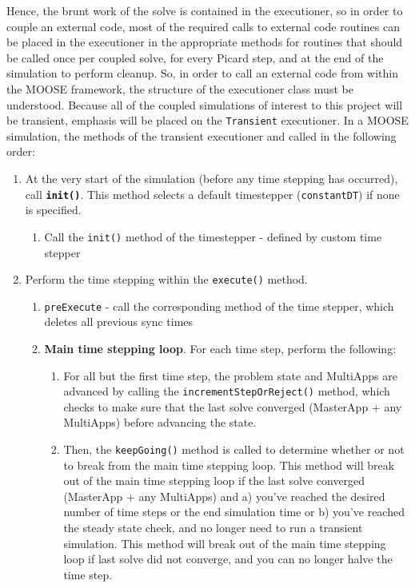 \documentclass[10pt]{article}
\numberwithin{equation}{section} %
\begin{document}
Hence, the brunt work of the solve is contained in the executioner, so in order to couple an external code, most of the required calls to external code routines can be placed in the executioner in the appropriate methods for routines that should be called once per coupled solve, for every Picard step, and at the end of the simulation to perform cleanup. So, in order to call an external code from within the MOOSE framework, the structure of the executioner class must be understood. Because all of the coupled simulations of interest to this project will be transient, emphasis will be placed on the {\tt Transient} executioner. In a MOOSE simulation, the methods of the transient executioner and called in the following order:

\begin{enumerate}
\item At the very start of the simulation (before any time stepping has occurred), call {\bf {\tt init()}}. This method selects a default timestepper ({\tt constantDT}) if none is specified.
	\begin{enumerate}
	\item Call the {\tt init()} method of the timestepper - defined by custom time stepper
	\end{enumerate}
\item Perform the time stepping within the {\tt execute()} method.
	\begin{enumerate}
	\item {\tt preExecute} - call the corresponding method of the time stepper, which deletes all previous sync times
	\item {\bf Main time stepping loop}. For each time step, perform the following:
		\begin{enumerate}
		\item For all but the first time step, the problem state and MultiApps are advanced by calling the {\tt incrementStepOrReject()} method, which checks to make sure that the last solve converged (MasterApp + any MultiApps) before advancing the state.
		\item Then, the {\tt keepGoing()} method is called to determine whether or not to break from the main time stepping loop. This method will break out of the main time stepping loop if the last solve converged (MasterApp + any MultiApps) and a) you've reached the desired number of time steps or the end simulation time or b) you've reached the steady state check, and no longer need to run a transient simulation. This method will break out of the main time stepping loop if last solve did not converge, and you can no longer halve the time step.

\end{enumerate}
\end{enumerate}
\end{enumerate}
\end{document}
